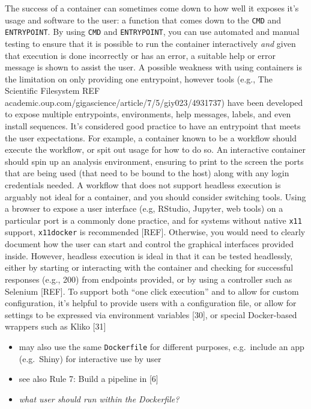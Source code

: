 \documentclass[10pt,letterpaper]{article}
\providecommand{\tightlist}{%
  \setlength{\itemsep}{0pt}\setlength{\parskip}{0pt}}
\begin{document}
The success of a container can sometimes come down to how well it
exposes it's usage and software to the user: a function that comes down
to the \texttt{CMD} and \texttt{ENTRYPOINT}. By using \texttt{CMD} and
\texttt{ENTRYPOINT}, you can use automated and manual testing to ensure
that it is possible to run the container interactively \emph{and} given
that execution is done incorrectly or has an error, a suitable help or
error message is shown to assist the user. A possible weakness with
using containers is the limitation on only providing one entrypoint,
however tools (e.g., The Scientific Filesystem REF
academic.oup.com/gigascience/article/7/5/giy023/4931737) have been
developed to expose multiple entrypoints, environments, help messages,
labels, and even install sequences. It's considered good practice to
have an entrypoint that meets the user expectations. For example, a
container known to be a workflow should execute the workflow, or spit
out usage for how to do so. An interactive container should spin up an
analysis environment, ensuring to print to the screen the ports that are
being used (that need to be bound to the host) along with any login
credentials needed. A workflow that does not support headless execution
is arguably not ideal for a container, and you should consider switching
tools. Using a browser to expose a user interface (e.g, RStudio,
Jupyter, web tools) on a particular port is a commonly done practice,
and for systems without native \texttt{x11} support, \texttt{x11docker}
is recommended {[}REF{]}. Otherwise, you would need to clearly document
how the user can start and control the graphical interfaces provided
inside. However, headless execution is ideal in that it can be tested
headlessly, either by starting or interacting with the container and
checking for successful responses (e.g., 200) from endpoints provided,
or by using a controller such as Selenium {[}REF{]}. To support both
``one click execution'' and to allow for custom configuration, it's
helpful to provide users with a configuration file, or allow for
settings to be expressed via environment variables {[}30{]}, or special
Docker-based wrappers such as Kliko {[}31{]}

\begin{itemize}
\tightlist
\item
  may also use the same \texttt{Dockerfile} for different purposes,
  e.g.~include an app (e.g.~Shiny) for interactive use by user
\item
  see also Rule 7: Build a pipeline in {[}6{]}
\item
  \emph{what user should run within the Dockerfile?} 
\end{itemize}
\end{document}
